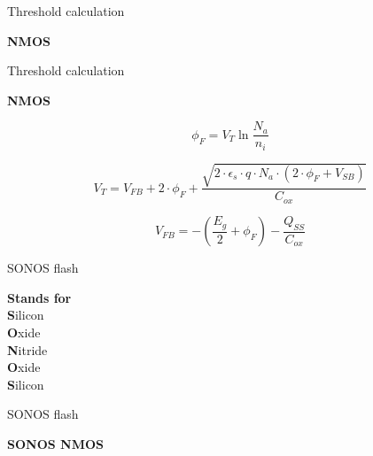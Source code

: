 \documentclass[aspectratio=169]{beamer}
\begin{document}
\begin{frame}{Threshold calculation}
	\begin{center}
		\textbf{NMOS}

		\begin{tikzpicture}[node distance = 3cm, auto, thick, scale=0.75, every node/.style={transform shape}]
			
		\end{tikzpicture}
	\end{center}
\end{frame}

\begin{frame}{Threshold calculation}
	\begin{center}
		\textbf{NMOS}

		\begin{equation}
			\phi_F = V_T \ln\frac{N_a}{n_i}
		\end{equation}

		\begin{equation}
			V_T
			=
			V_{FB}
			+
			2 \cdot \phi_F
			+
			\frac{\sqrt{2 \cdot \epsilon_s  \cdot q \cdot N_a \cdot \left( 2 \cdot \phi_F + V_{SB} \right) }}{C_{ox}}
		\end{equation}

		\begin{equation}
			V_{FB} = -\left( \frac{E_g}{2} + \phi_F \right) - \frac{Q_{SS}}{C_{ox}}
		\end{equation}

	\end{center}
\end{frame}

\begin{frame}{SONOS flash}
	\begin{center}
		\textbf{Stands for} \\
		\textbf{S}ilicon \\
		\textbf{O}xide \\
		\textbf{N}itride \\
		\textbf{O}xide \\
		\textbf{S}ilicon \\
    \end{center}
\end{frame}

\begin{frame}{SONOS flash}
	\begin{center}
        \textbf{SONOS NMOS}

        \begin{tikzpicture}[node distance = 3cm, auto, thick, scale=0.75, every node/.style={transform shape}]
			
		\end{tikzpicture}
	\end{center}
\end{frame}
\end{document}
